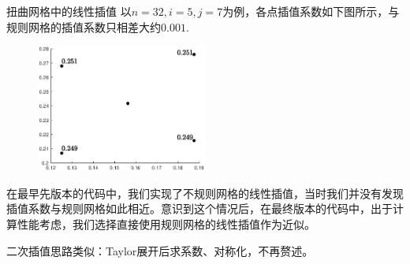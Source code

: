 \documentclass[9pt]{beamer}
\begin{document}
\begin{frame}{扭曲网格中的线性插值}
以$n=32,i=5,j=7$为例，各点插值系数如下图所示，与规则网格的插值系数只相差大约$0.001$.
\begin{figure}[H]
  \centering
  \includegraphics[width=0.5\textwidth]{../report/figure/3-5.eps}
\end{figure}

\pause
在最早先版本的代码中，我们实现了不规则网格的线性插值，当时我们并没有发现插值系数与规则网格如此相近。意识到这个情况后，在最终版本的代码中，出于计算性能考虑，我们选择直接使用规则网格的线性插值作为近似。

\pause
\vspace{1em}
二次插值思路类似：Taylor展开后求系数、对称化，不再赘述。
\end{frame}
\end{document}
